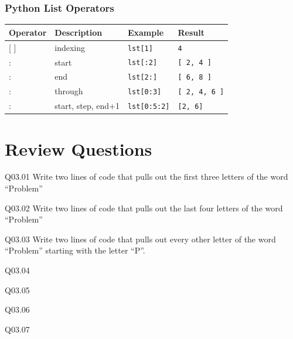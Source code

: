 \documentclass{book}
\newenvironment{problems}{}{}  %
\begin{document}
\subsubsection{Python List Operators}\label{python-list-operators}

\begin{longtable}[]{@{}llll@{}}
\toprule
Operator & Description & Example & Result\tabularnewline
\midrule
\endhead
{[} {]} & indexing & \lstinline!lst[1]! & \lstinline!4!\tabularnewline
: & start & \lstinline!lst[:2]! & \lstinline![ 2, 4 ]!\tabularnewline
: & end & \lstinline!lst[2:]! & \lstinline![ 6, 8 ]!\tabularnewline
: & through & \lstinline!lst[0:3]! &
\lstinline![ 2, 4, 6 ]!\tabularnewline
: & start, step, end+1 & \lstinline!lst[0:5:2]! &
\lstinline![2, 6]!\tabularnewline
\bottomrule
\end{longtable}
    




    
        \section{Review Questions}\label{review-questions}
    




    
        \begin{problems}
        Q03.01 Write two lines of code that pulls out the first three letters of
the word ``Problem''

Q03.02 Write two lines of code that pulls out the last four letters of
the word ``Problem''

Q03.03 Write two lines of code that pulls out every other letter of the
word ``Problem'' starting with the letter ``P''.

Q03.04

Q03.05

Q03.06

Q03.07
        \end{problems}

    
\end{document}
